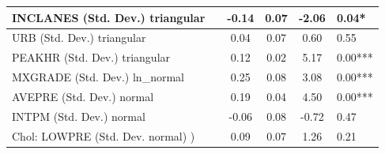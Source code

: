 \begin{table}
\begin{center}
\begin{tabular}{|l|l|c|c|c|l|}
			\hline
			INCLANES (Std. Dev.) triangular &  & -0.14 & 0.07 & -2.06 & 0.04* \\
			\hline
			URB (Std. Dev.) triangular &  & 0.04 & 0.07 & 0.60 & 0.55 \\
			\hline
			PEAKHR (Std. Dev.) triangular &  & 0.12 & 0.02 & 5.17 & 0.00*** \\
			\hline
			MXGRADE (Std. Dev.) ln_normal &  & 0.25 & 0.08 & 3.08 & 0.00*** \\
			\hline
			AVEPRE (Std. Dev.) normal &  & 0.19 & 0.04 & 4.50 & 0.00*** \\
			\hline
			INTPM (Std. Dev.) normal &  & -0.06 & 0.08 & -0.72 & 0.47 \\
			\hline
			 Chol: LOWPRE (Std. Dev. normal) ) &  & 0.09 & 0.07 & 1.26 & 0.21 \\
			\hline
		\end{tabular}
	\end{center}
\end{table}